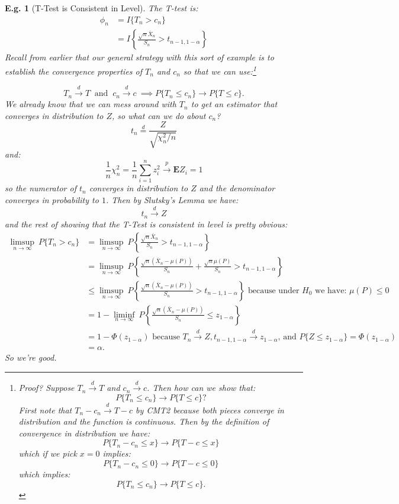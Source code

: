 \documentclass{tufte-book}
\theoremstyle{mytheoremstyle}
\theoremstyle{mylemstyle}
\theoremstyle{mydefstyle}
\newtheorem*{ex}{E.g.}
\begin{document}
\begin{ex}[T-Test is Consistent in Level] The T-test is:
	\begin{align*}
		\phi_n & = I\{T_n > c_n\} \\
			& = I\left\{\frac{\sqrt{n}\bar{X}_n}{S_n} > t_{n-1, 1-\alpha}\right\}
	\end{align*}
Recall from earlier that our general strategy with this sort of example is to establish the convergence properties of \(T_n\) and \(c_n\) so that we can use:\footnote{Proof? Suppose \(T_n \overset{d}{\rightarrow} T\) and \(c_n \overset{d}{\rightarrow} c\). Then how can we show that:
	\[P\{T_n \le c_n\} \rightarrow P\{T \le c\} \text{?}\]
First note that \(T_n - c_n \overset{d}{\rightarrow} T - c\) by CMT2 because both pieces converge in distribution and the function is continuous. Then by the definition of convergence in distribution we have:
	\[P\{T_n - c_n \le x\} \rightarrow P\{T - c \le x\}\]
which if we pick \(x = 0\) implies:
	\[P\{T_n - c_n \le 0\} \rightarrow P\{T - c \le 0\} \]
which implies:
	\[P\{T_n \le c_n\} \rightarrow P\{T \le c\} \text{.}\] }

	\[T_n \overset{d}{\rightarrow} T\ \text{ and }\ c_n \overset{d}{\rightarrow} c\ \implies P\{T_n \le c_n\} \rightarrow P\{T \le c\} \text{.}\]
We already know that we can mess around with \(T_n\) to get an estimator that converges in distribution to \(Z\), so what can we do about \(c_n\)? 
	\[t_n \overset{d}{=} \frac{Z}{\sqrt{\chi^2_n/n}} \]
and:
	\[\frac{1}{n}\chi_n^2 = \frac{1}{n}\sum_{i = 1}^n z_i^2 \overset{p}{\rightarrow} \mathbf{E}Z_i = 1\]
so the numerator of \(t_n\) converges in distribution to \(Z\) and the denominator converges in probability to \(1\). Then by Slutsky's Lemma we have: 
	\[t_n \overset{d}{\rightarrow} Z\]
and the rest of showing that the T-Test is consistent in level is pretty obvious:
	\begin{align*}
		\limsup_{n \rightarrow \infty}\ P\{T_n > c_n\} & = \limsup_{n \rightarrow \infty}\ P\left\{\frac{\sqrt{n}\bar{X}_n}{S_n} > t_{n - 1, 1-\alpha}\right\} \\
							& = \limsup_{n \rightarrow \infty}\ P\left\{\frac{\sqrt{n}(\bar{X}_n - \mu(P))}{S_n} + \frac{\sqrt{n}\mu(P)}{S_n} > t_{n-1, 1-\alpha}\right\} \\
							& \le \limsup_{n \rightarrow \infty}\ P\left\{\frac{\sqrt{n}(\bar{X}_n - \mu(P))}{S_n} > t_{n-1, 1-\alpha}\right\} \text{ because under \(H_0\) we have: \(\mu(P) \le 0\)} \\
							& = 1 - \liminf_{n \rightarrow \infty}\ P\left\{\frac{\sqrt{n}(\bar{X}_n - \mu(P))}{S_n} \le z_{1-\alpha}\right\} \\
							& = 1 - \Phi(z_{1-\alpha}) \text{ because \(T_n \overset{d}{\rightarrow} Z, t_{n-1, 1-\alpha} \overset{d}{\rightarrow} z_{1-\alpha}\), and \(P\{Z \le z_{1-\alpha}\} = \Phi(z_{1-\alpha})\)} \\
							& = \alpha \text{.}
	\end{align*}
So we're good. 		
\end{ex}
\end{document}
